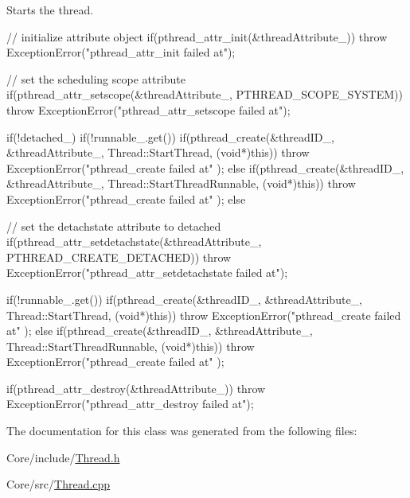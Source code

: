 Starts the thread. 


\begin{DoxyCode}
{
        // initialize attribute object
        if(pthread_attr_init(&threadAttribute_))
                throw ExceptionError("pthread_attr_init failed at");

        // set the scheduling scope attribute
        if(pthread_attr_setscope(&threadAttribute_, PTHREAD_SCOPE_SYSTEM))
                throw ExceptionError("pthread_attr_setscope failed at");

        if(!detached_) 
        {
                if(!runnable_.get()) 
                {       
                        if(pthread_create(&threadID_, &threadAttribute_, 
      Thread::StartThread, (void*)this))
                                throw ExceptionError("pthread_create failed at"
      );
                }
                else 
                {       
                        if(pthread_create(&threadID_, &threadAttribute_, 
      Thread::StartThreadRunnable, (void*)this))
                                throw ExceptionError("pthread_create failed at"
      );
                }
        }
        else 
        {
                // set the detachstate attribute to detached    
                if(pthread_attr_setdetachstate(&threadAttribute_, 
      PTHREAD_CREATE_DETACHED))
                        throw ExceptionError("pthread_attr_setdetachstate
       failed at");

                if(!runnable_.get()) 
                {       
                        if(pthread_create(&threadID_, &threadAttribute_, 
      Thread::StartThread, (void*)this))
                                throw ExceptionError("pthread_create failed at"
      );
                }
                else 
                {       
                        if(pthread_create(&threadID_, &threadAttribute_, 
      Thread::StartThreadRunnable, (void*)this))
                                throw ExceptionError("pthread_create failed at"
      );
                }
        }

        if(pthread_attr_destroy(&threadAttribute_)) 
                throw ExceptionError("pthread_attr_destroy failed at");
}
\end{DoxyCode}


The documentation for this class was generated from the following files\-:\begin{DoxyCompactItemize}
\item 
Core/include/\hyperlink{_thread_8h}{Thread.\-h}\item 
Core/src/\hyperlink{_thread_8cpp}{Thread.\-cpp}\end{DoxyCompactItemize}
